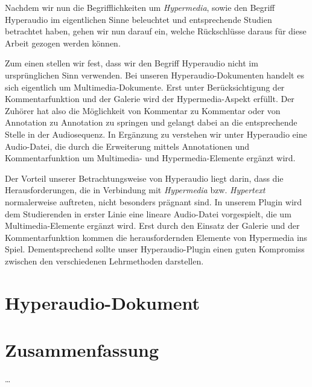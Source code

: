 
Nachdem wir nun die Begrifflichkeiten um \textit{Hypermedia}, sowie den Begriff Hyperaudio im eigentlichen Sinne beleuchtet und entsprechende Studien betrachtet haben, gehen wir nun darauf ein, welche Rückschlüsse daraus für diese Arbeit gezogen werden können.

Zum einen stellen wir fest, dass wir den Begriff Hyperaudio nicht im ursprünglichen Sinn verwenden. Bei unseren Hyperaudio-Dokumenten handelt es sich eigentlich um Multimedia-Dokumente. Erst unter Berücksichtigung der Kommentarfunktion und der Galerie wird der Hypermedia-Aspekt erfüllt. Der Zuhörer hat also die Möglichkeit von Kommentar zu Kommentar oder von Annotation zu Annotation zu springen und gelangt dabei an die entsprechende Stelle in der Audiosequenz. In Ergänzung zu \cite{zumbach2006learning} verstehen wir unter Hyperaudio eine Audio-Datei, die durch die Erweiterung mittels Annotationen und Kommentarfunktion um Multimedia- und Hypermedia-Elemente ergänzt wird.

Der Vorteil unserer Betrachtungsweise von Hyperaudio liegt darin, dass die Herausforderungen, die in Verbindung mit \textit{Hypermedia} bzw. \textit{Hypertext} normalerweise auftreten, nicht besonders prägnant sind. In unserem Plugin wird dem Studierenden in erster Linie eine lineare Audio-Datei vorgespielt, die um Multimedia-Elemente ergänzt wird. Erst durch den Einsatz der Galerie und der Kommentarfunktion kommen die herausfordernden Elemente von Hypermedia ins Spiel. Dementsprechend sollte unser Hyperaudio-Plugin einen guten Kompromiss zwischen den verschiedenen Lehrmethoden darstellen.


\section{Hyperaudio-Dokument}
\label{sec:hyperaudio}


\section{Zusammenfassung}
\dots